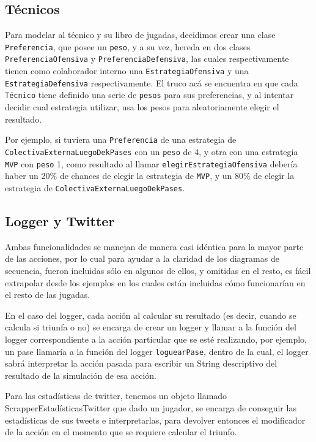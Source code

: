 \subsection{Técnicos}
Para modelar al técnico y su libro de jugadas, decidimos crear una clase \texttt{Preferencia}, que posee un \texttt{peso}, y a su vez, hereda en dos clases \texttt{PreferenciaOfensiva} y \texttt{PreferenciaDefensiva}, las cuales respectivamente tienen como colaborador interno una \texttt{EstrategiaOfensiva} y una \texttt{EstrategiaDefensiva} respectivamente. El truco acá se encuentra en que cada \texttt{Técnico} tiene definido una serie de \texttt{pesos} para sus preferencias, y al intentar decidir cual estrategia utilizar, usa los pesos para aleatoriamente elegir el resultado.

Por ejemplo, si tuviera una \texttt{Preferencia} de una estrategia de \texttt{ColectivaExternaLuegoDekPases} con un \texttt{peso} de 4, y  otra con una estrategia \texttt{MVP} con \texttt{peso} 1, como resultado al llamar \texttt{elegirEstrategiaOfensiva} debería haber un 20\% de chances de elegir la estrategia de \texttt{MVP}, y un 80\% de elegir la estrategia de \texttt{ColectivaExternaLuegoDekPases}.

\subsection{Logger y Twitter}
Ambas funcionalidades se manejan de manera casi idéntica para la mayor parte de las acciones, por lo cual para ayudar a la claridad de los diagramas de secuencia, fueron incluidas sólo en algunos de ellos, y omitidas en el resto, es fácil extrapolar desde los ejemplos en los cuales están incluidas cómo funcionarían en el resto de las jugadas.

En el caso del logger, cada acción al calcular su resultado (es decir, cuando se calcula si triunfa o no) se encarga de crear un logger y llamar a la función del logger correspondiente a la acción particular que se esté realizando, por ejemplo, un pase llamaría a la función del logger \texttt{loguearPase}, dentro de la cual, el logger sabrá interpretar la acción pasada para escribir un String descriptivo del resultado de la simulación de esa acción.

Para las estadísticas de twitter, tenemos un objeto llamado ScrapperEstadísticasTwitter que dado un jugador, se encarga de conseguir las estadísticas de sus tweets e interpretarlas, para devolver entonces el modificador de la acción en el momento que se requiere calcular el triunfo.

